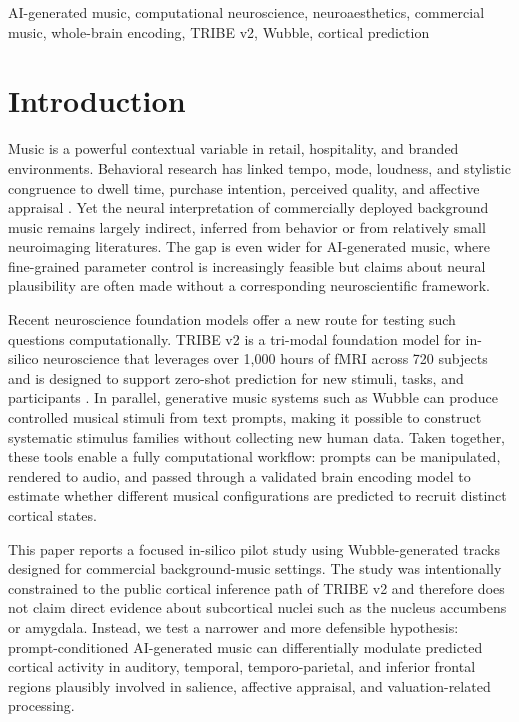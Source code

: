 \documentclass[conference]{IEEEtran}
\begin{document}
\begin{IEEEkeywords}
AI-generated music, computational neuroscience, neuroaesthetics, commercial music, whole-brain encoding, TRIBE v2, Wubble, cortical prediction
\end{IEEEkeywords}

\section{Introduction}

Music is a powerful contextual variable in retail, hospitality, and branded environments. Behavioral research has linked tempo, mode, loudness, and stylistic congruence to dwell time, purchase intention, perceived quality, and affective appraisal \cite{north1999,garlin2006}. Yet the neural interpretation of commercially deployed background music remains largely indirect, inferred from behavior or from relatively small neuroimaging literatures. The gap is even wider for AI-generated music, where fine-grained parameter control is increasingly feasible but claims about neural plausibility are often made without a corresponding neuroscientific framework.

Recent neuroscience foundation models offer a new route for testing such questions computationally. TRIBE v2 is a tri-modal foundation model for in-silico neuroscience that leverages over 1,000 hours of fMRI across 720 subjects and is designed to support zero-shot prediction for new stimuli, tasks, and participants \cite{tribev2}. In parallel, generative music systems such as Wubble can produce controlled musical stimuli from text prompts, making it possible to construct systematic stimulus families without collecting new human data. Taken together, these tools enable a fully computational workflow: prompts can be manipulated, rendered to audio, and passed through a validated brain encoding model to estimate whether different musical configurations are predicted to recruit distinct cortical states.

This paper reports a focused in-silico pilot study using Wubble-generated tracks designed for commercial background-music settings. The study was intentionally constrained to the public cortical inference path of TRIBE v2 and therefore does not claim direct evidence about subcortical nuclei such as the nucleus accumbens or amygdala. Instead, we test a narrower and more defensible hypothesis: prompt-conditioned AI-generated music can differentially modulate predicted cortical activity in auditory, temporal, temporo-parietal, and inferior frontal regions plausibly involved in salience, affective appraisal, and valuation-related processing.
\end{document}
